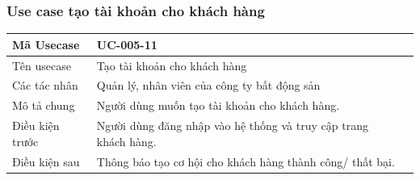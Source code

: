 \documentclass[12pt,a4paper]{article}
\begin{document}
    \subsubsection*{Use case tạo tài khoản cho khách hàng}
    \begin{table}[H]
        \centering
        \begin{tabular}{|p{3.5cm}|p{11.5cm}|c|}
            \hline
            Mã Usecase      & UC-005-11                                                       \\
            \hline
            Tên usecase     & Tạo tài khoản cho khách hàng                                    \\
            \hline
            Các tác nhân    & Quản lý, nhân viên của công ty bất động sản                     \\
            \hline
            Mô tả chung     & Người dùng muốn tạo tài khoản cho khách hàng.                   \\
            \hline

            Điều kiện trước & Người dùng đăng nhập vào hệ thống và truy cập trang khách hàng. \\
            \hline

            Điều kiện sau   & Thông báo tạo cơ hội cho khách hàng thành công/ thất bại.       \\
            \hline


\end{tabular}
\end{table}
\end{document}
